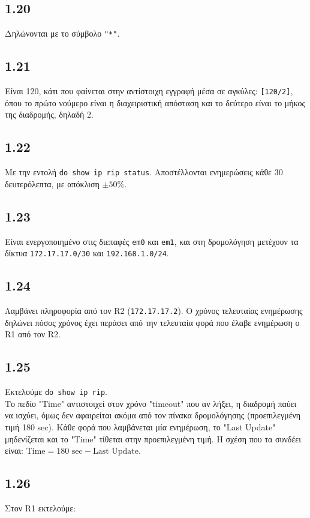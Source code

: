 \documentclass[a4paper, 12pt]{article}
\begin{document}
	\subsection*{1.20}
		Δηλώνονται με το σύμβολο \verb|"*"|.

	\subsection*{1.21}
		Είναι 120, κάτι που φαίνεται στην αντίστοιχη εγγραφή μέσα σε αγκύλες: \verb|[120/2]|, όπου το πρώτο νούμερο είναι η διαχειριστική απόσταση και το δεύτερο είναι το μήκος της διαδρομής, δηλαδή 2.

	\subsection*{1.22} 
		Με την εντολή \verb|do show ip rip status|. Αποστέλλονται ενημερώσεις κάθε 30 δευτερόλεπτα, με απόκλιση $\pm\text{50\%}$.

	\subsection*{1.23}
		Είναι ενεργοποιημένο στις διεπαφές \verb|em0| και \verb|em1|, και στη δρομολόγηση μετέχουν τα δίκτυα \verb|172.17.17.0/30| και \verb|192.168.1.0/24|.
	
	\subsection*{1.24}
		Λαμβάνει πληροφορία από τον R2 (\verb|172.17.17.2|). Ο χρόνος τελευταίας ενημέρωσης δηλώνει πόσος χρόνος έχει περάσει από την τελευταία φορά που έλαβε ενημέρωση ο R1 από τον R2.

	\subsection*{1.25}
		Εκτελούμε \verb|do show ip rip|. \\
		
		Το πεδίο "Time" αντιστοιχεί στον χρόνο "timeout" που αν λήξει, η διαδρομή παύει να ισχύει, όμως δεν αφαιρείται ακόμα από τον πίνακα δρομολόγησης (προεπιλεγμένη τιμή 180 sec). Κάθε φορά που λαμβάνεται μία ενημέρωση, το "Last Update" μηδενίζεται και το "Time" τίθεται στην προεπιλεγμένη τιμή. Η σχέση που τα συνδέει είναι: $\text{Time} = 180 \text{ sec} - \text{Last Update}$.

	\subsection*{1.26}
		Στον R1 εκτελούμε:
		
\end{document}
